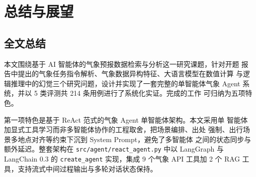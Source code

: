 \documentclass[a4paper]{article}
\newcommand{\sectionbreak}{\clearpage} %
\theoremstyle{definition}
\theoremstyle{plain}
\theoremstyle{remark}
\newcommand{\reftab}[1]{表 \ref{#1}}
\newcommand{\bk}{\discretionary{}{}{}}
\begin{document}
\sectionbreak

\section{总结与展望}
\label{chap:conclusion}


\subsection{全文总结}
\label{sec:summary}

本文围绕基于 AI 智能体的气象预报数据检索与分析这一研究课题，针对开题
报告中提出的气象任务指令解析、气象数据异构特征、大语言模型在数值计算
与逻辑推理中的幻觉三个研究问题，设计并实现了一套完整的单智能体气象
Agent 系统，并以 5 类评测共 214 条用例进行了系统化实证。完成的工作
可归纳为五项特色。

第一项特色是基于 ReAct 范式的气象 Agent 单智能体架构。本文采用单
智能体加显式工具学习而非多智能体协作的工程取舍，把场景编排、出处
强制、出行场景多地点对齐等约束下沉到 System Prompt，避免了多智能体
之间的状态同步与额外延迟。整套架构在
\texttt{src/\bk{}agent/\bk{}react\_\bk{}agent.\bk{}py} 中以 LangGraph 与 LangChain 0.3
的 \texttt{create\_\bk{}agent} 实现，集成 9 个气象 API 工具加 2 个 RAG
工具，支持流式中间过程输出与多轮对话状态保持。
\end{document}
